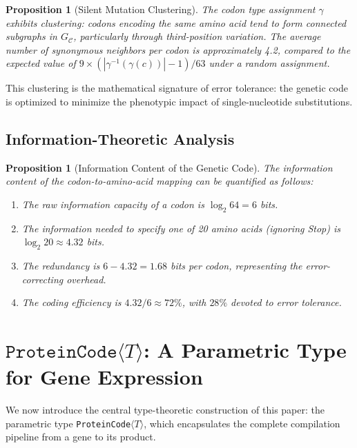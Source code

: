 \documentclass[12pt,a4paper]{article}
\newtheorem{proposition}[theorem]{Proposition}
\theoremstyle{definition}
\newcommand{\ProteinCode}{\texttt{ProteinCode}\ensuremath{\langle T \rangle}}
\begin{document}
\begin{proposition}[Silent Mutation Clustering]\label{prop:clustering}
The codon type assignment $\gamma$ exhibits \emph{clustering}: codons encoding the same amino acid tend to form connected subgraphs in $G_\mathcal{C}$, particularly through third-position variation. The average number of synonymous neighbors per codon is approximately 4.2, compared to the expected value of $9 \times (|\gamma^{-1}(\gamma(c))| - 1) / 63$ under a random assignment.
\end{proposition}

This clustering is the mathematical signature of error tolerance: the genetic code is optimized to minimize the phenotypic impact of single-nucleotide substitutions.

\subsection{Information-Theoretic Analysis}

\begin{proposition}[Information Content of the Genetic Code]\label{prop:information}
The information content of the codon-to-amino-acid mapping can be quantified as follows:
\begin{enumerate}[label=(\alph*)]
  \item The raw information capacity of a codon is $\log_2 64 = 6$ bits.
  \item The information needed to specify one of 20 amino acids (ignoring Stop) is $\log_2 20 \approx 4.32$ bits.
  \item The redundancy is $6 - 4.32 = 1.68$ bits per codon, representing the error-correcting overhead.
  \item The coding efficiency is $4.32 / 6 \approx 72\%$, with $28\%$ devoted to error tolerance.
\end{enumerate}
\end{proposition}


\section{\texorpdfstring{$\texttt{ProteinCode}\langle T \rangle$}{ProteinCode<T>}: A Parametric Type for Gene Expression}\label{sec:proteincode}

We now introduce the central type-theoretic construction of this paper: the parametric type \ProteinCode{}, which encapsulates the complete compilation pipeline from a gene to its product.
\end{document}
